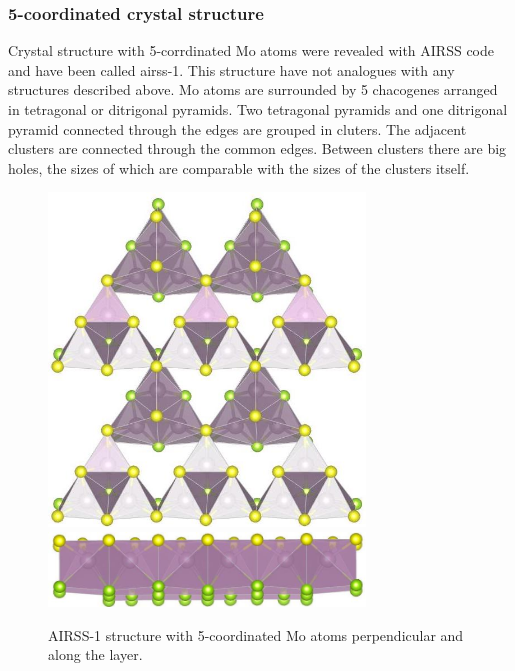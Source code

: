 \documentclass[a4paperm]{article}
\begin{document}
\subsubsection{5-coordinated crystal structure}

Crystal structure with 5-corrdinated Mo atoms were revealed with AIRSS code and have been called airss-1.
This structure have not analogues with any structures described above.
Mo atoms are surrounded by 5 chacogenes arranged in tetragonal or ditrigonal pyramids.
Two tetragonal pyramids and one ditrigonal pyramid connected through the edges are grouped in cluters.
The adjacent clusters are connected through the common edges.
Between clusters there are big holes, the sizes of which are comparable with the sizes of the clusters itself.

\begin{figure}[H]
        \includegraphics[width=0.75\textwidth]{airss-1-1.jpg} \\ \vspace{3mm}
        \includegraphics[width=0.75\textwidth]{airss-1-2.jpg}
        \caption{AIRSS-1 structure with 5-coordinated Mo atoms perpendicular and along the layer.}
\label{airss-1}
\end{figure}
\end{document}
